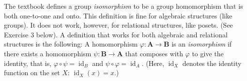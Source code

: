\documentclass[12pt,reqno]{amsart}
\newcommand{\bA}{\ensuremath{\mathbf{A}}}
\newcommand{\bB}{\ensuremath{\mathbf{B}}}
\newcommand{\<}{\ensuremath{\langle}}
\renewcommand{\>}{\ensuremath{\rangle}}
\begin{document}
\vskip5mm

\noindent The textbook defines a group \emph{isomorphism} to be a group homomorphism that is both
one-to-one and onto.  This definition is fine for algebraic structures (like
groups).  
It does not work, however, for relational structures, like posets. (See Exercise 3 below).
A definition that works for both algebraic and relational structures is the following:
A homomorphism $\varphi : \bA \rightarrow \bB$ is an \emph{isomorphism} if there
exists a homomorphism $\psi: \bB \rightarrow \bA$ that composes with
$\varphi$ to give the identity, that is,
$\varphi \circ \psi = \operatorname{id}_B$
and $\psi \circ \varphi= \operatorname{id}_A$. (Here, $\operatorname{id}_X$
denotes the identity function on the set $X$: $\operatorname{id}_X(x) = x$.)

\newpage

\end{document}
